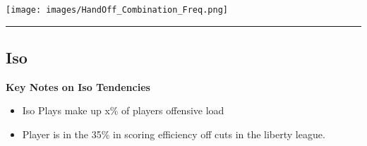 \documentclass[a4paper,12pt]{article}
\begin{document}
\begin{table}[H]
{\begin{minipage}[t]{0.6\textwidth}
{\begin{tabular}
                
            
                
            
                
            
                
            
                
            
                
            
                
            


            \bottomrule
        \end{tabular}
        } %
    \end{minipage}
    } %
    \hfill %
    \begin{minipage}[c]{0.35\textwidth} %
        \flushright
        \texttt{[image: images/HandOff\_Combination\_Freq.png]} %
    \end{minipage}
\end{table}

\vspace{-1em} %
\hrule height 1pt width 1\textwidth %
\vspace{1em} %

\clearpage


\subsection{Iso}
\vspace{0.25em} %
\textbf{Key Notes on Iso Tendencies}
\vspace{0.5em} %

\begin{itemize}
    \item Iso Plays make up x\% of players offensive load
    \vspace{0.3em} %
    \item Player is in the 35\% in scoring efficiency off cuts in the liberty league.
\end{itemize}
\end{document}
